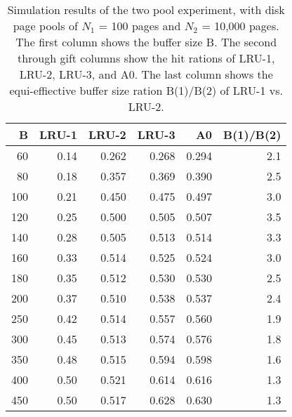 \begin{table}
\begin{center}
\caption{Simulation results of the two pool experiment, with disk page pools of $N_1$ = 100 pages and $N_2$ = 10,000 pages. The first column shows the buffer size B. The second through gift columns show the hit rations of LRU-1, LRU-2, LRU-3, and A0. The last column shows the equi-effiective buffer size ration B(1)/B(2) of LRU-1 vs. LRU-2.}
\begin{tabular}{| r | r | r | r | r | r |}
\hline
B & LRU-1 & LRU-2 & LRU-3 & A0 & B(1)/B(2) \\ 
\hline
60 & 0.14 & 0.262 & 0.268 & 0.294 & 2.1 \\ 
\hline
80 & 0.18 & 0.357 & 0.369 & 0.390 & 2.5 \\ 
\hline
100 & 0.21 & 0.450 & 0.475 & 0.497 & 3.0 \\ 
\hline
120 & 0.25 & 0.500 & 0.505 & 0.507 & 3.5 \\ 
\hline
140 & 0.28 & 0.505 & 0.513 & 0.514 & 3.3 \\ 
\hline
160 & 0.33 & 0.514 & 0.525 & 0.524 & 3.0 \\ 
\hline
180 & 0.35 & 0.512 & 0.530 & 0.530 & 2.5 \\ 
\hline
200 & 0.37 & 0.510 & 0.538 & 0.537 & 2.4 \\ 
\hline
250 & 0.42 & 0.514 & 0.557 & 0.560 & 1.9 \\ 
\hline
300 & 0.45 & 0.513 & 0.574 & 0.576 & 1.8 \\ 
\hline
350 & 0.48 & 0.515 & 0.594 & 0.598 & 1.6 \\ 
\hline
400 & 0.50 & 0.521 & 0.614 & 0.616 & 1.3 \\ 
\hline
450 & 0.50 & 0.517 & 0.628 & 0.630 & 1.3 \\
\hline
\end{tabular}
\end{center}
\end{table}

